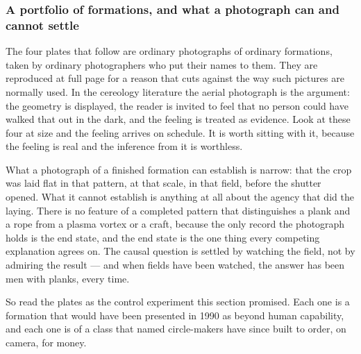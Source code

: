 \subsubsection*{A portfolio of formations, and what a photograph can and cannot settle}

The four plates that follow are ordinary photographs of ordinary formations, taken by ordinary
photographers who put their names to them. They are reproduced at full page for a reason that cuts
against the way such pictures are normally used. In the cereology literature the aerial photograph
is the argument: the geometry is displayed, the reader is invited to feel that no person could
have walked that out in the dark, and the feeling is treated as evidence. Look at these four at
size and the feeling arrives on schedule. It is worth sitting with it, because the feeling is real
and the inference from it is worthless.

What a photograph of a finished formation can establish is narrow: that the crop was laid flat in
that pattern, at that scale, in that field, before the shutter opened. What it cannot establish is
anything at all about the agency that did the laying. There is no feature of a completed pattern
that distinguishes a plank and a rope from a plasma vortex or a craft, because the only record the
photograph holds is the end state, and the end state is the one thing every competing explanation
agrees on. The causal question is settled by watching the field, not by admiring the result --- and
when fields have been watched, the answer has been men with planks, every time.

So read the plates as the control experiment this section promised. Each one is a formation that
would have been presented in 1990 as beyond human capability, and each one is of a class that
named circle-makers have since built to order, on camera, for money.



